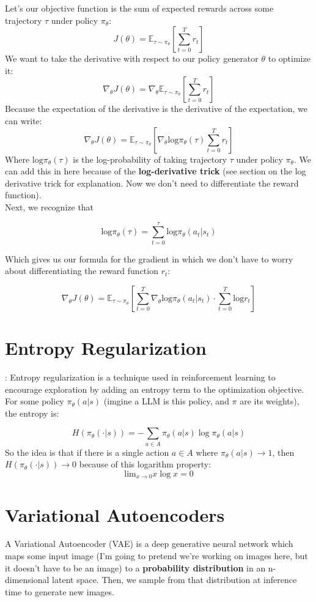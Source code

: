 \documentclass[12pt]{article}
\begin{document}
Let's our objective function is the sum of expected rewards across some trajectory \(\tau\) under policy \(\pi_\theta\):
\[J(\theta) = \mathbb{E}_{\tau \sim \pi_\theta}\left[\sum_{t=0}^Tr_t\right]\]
We want to take the derivative with respect to our policy generator \(\theta\) to optimize it:
\[\nabla_\theta J(\theta) =\nabla_\theta \mathbb{E}_{\tau \sim \pi_\theta}\left[\sum_{t=0}^Tr_t\right]\]
Because the expectation of the derivative is the derivative of the expectation, we can write:
\[\nabla_\theta J(\theta) = \mathbb{E}_{\tau \sim \pi_\theta}\left[\nabla_\theta \text{log}\pi_\theta (\tau)\sum_{t=0}^Tr_t\right]\]
Where \(\text{log}\pi_\theta (\tau)\) is the log-probability of taking trajectory \(\tau\) under policy \(\pi_\theta\). We can add this in here because of the \textbf{log-derivative trick} (see section on the log derivative trick for explanation. Now we don't need to differentiate the reward function).\\

Next, we recognize that 

\[\text{log}\pi_\theta (\tau) = \sum_{t=0}^\tau \text{log} \pi_\theta (a_t | s_t)\]

Which gives us our formula for the gradient in which we don't have to worry about differentiating the reward function \(r_t\):

\[\nabla_\theta J(\theta) =\mathbb{E}_{\tau \sim \pi_\theta}\left[\sum_{t=0}^T \nabla_\theta \text{log} \pi_\theta (a_t | s_t) \cdot \sum_{t=0}^T \text{log} r_t\right]\]

\section{Entropy Regularization}:
Entropy regularization is a technique used in reinforcement learning to encourage exploration by adding an entropy term to the optimization objective. For some policy \(\pi_\theta(a|s)\) (imgine a LLM is this policy, and \(\pi\) are its weights), the entropy is:

\[H(\pi_\theta(\cdot|s)) = -\sum_{a\in A}\pi_\theta(a|s)\log \pi_\theta(a|s)\]
So the idea is that if there is a single action \(a\in A\) where \(\pi_\theta(a|s) \rightarrow 1\), then  \(H(\pi_\theta(\cdot|s)) \rightarrow 0\) because of this logarithm property:
\[\text{lim}_{x \rightarrow 0} x\log x = 0\]




\section{Variational Autoencoders}
A Variational Autoencoder (VAE) is a deep generative neural network which maps some input image (I'm going to pretend we're working on images here, but it doesn't have to be an image) to a \textbf{probability distribution}  in an n-dimensional latent space. Then, we sample from that distribution at inference time to generate new images.\\
\end{document}
